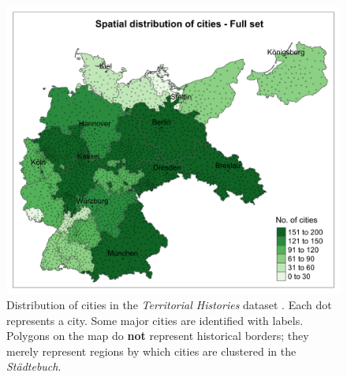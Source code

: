 \documentclass[11pt, a4paper]{article}
\begin{document}
\begin{figure}[ht]
    \centering
    \includegraphics[scale=0.15]{paper/output/descriptive/map_cities_raw.png}
    \caption{Distribution of cities in the \textit{Territorial Histories} dataset \citep{pt2}. Each dot represents a city. Some major cities are identified with labels. Polygons on the map do \textbf{not} represent historical borders; they merely represent regions by which cities are clustered in the \textit{Städtebuch}.}
    \label{fig:map_cities_raw}
\end{figure}
\end{document}
